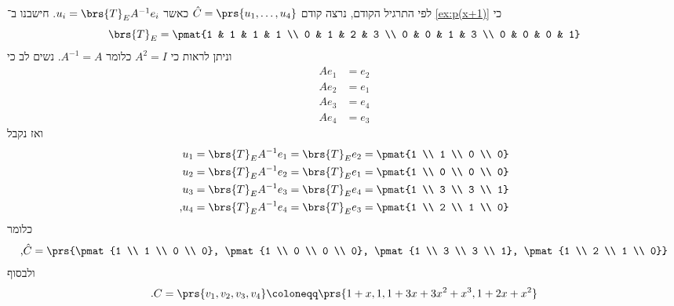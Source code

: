 \documentclass[a4paper,10pt,twoside,openany]{book}
\begin{document}
\begin{solution}
לפי התרגיל הקודם, נרצה קודם
$\hat{C} = \prs{u_1, \ldots, u_4}$
כאשר
$u_i = \brs{T}_E A^{-1} e_i$.
חישבנו ב־%
\ref{ex:p(x+1)}
כי
\[\brs{T}_E = \pmat{1 & 1 & 1 & 1 \\ 0 & 1 & 2 & 3 \\ 0 & 0 & 1 & 3 \\ 0 & 0 & 0 & 1}\]
וניתן לראות כי
$A^2 = I$
כלומר
$A^{-1} = A$.
נשים לב כי
\begin{align*}
A e_1 &= e_2 \\
A e_2 &= e_1 \\
A e_3 &= e_4 \\
A e_4 &= e_3
\end{align*}
ואז נקבל
\begin{align*}
u_1 &= \brs{T}_E A^{-1} e_1 = \brs{T}_E e_2 = \pmat{1 \\ 1 \\ 0 \\ 0} \\
u_2 &= \brs{T}_E A^{-1} e_2 = \brs{T}_E e_1 = \pmat{1 \\ 0 \\ 0 \\ 0} \\
u_3 &= \brs{T}_E A^{-1} e_3 = \brs{T}_E e_4 = \pmat{1 \\ 3 \\ 3 \\ 1} \\
\text{,} u_4 &= \brs{T}_E A^{-1} e_4 = \brs{T}_E e_3 = \pmat{1 \\ 2 \\ 1 \\ 0}
\end{align*}
כלומר
\[\text{,} \hat{C} = \prs{\pmat{1 \\ 1 \\ 0 \\ 0}, \pmat{1 \\ 0 \\ 0 \\ 0}, \pmat{1 \\ 3 \\ 3 \\ 1}, \pmat{1 \\ 2 \\ 1 \\ 0}}\]
ולבסוף
\[\text{.} C = \prs{v_1, v_2, v_3, v_4} \coloneqq \prs{1+x, 1, 1+3x+3x^2+x^3, 1+2x+x^2}\]


\end{solution}
\end{document}
